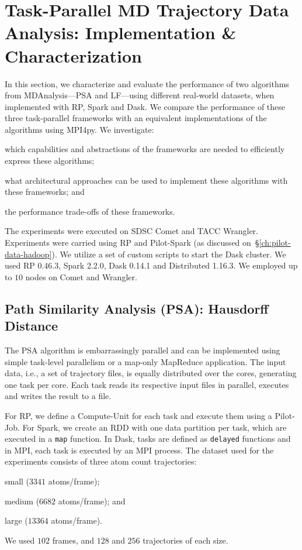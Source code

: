 \section{Task-Parallel MD Trajectory Data Analysis: Implementation \& Characterization}
\label{sec:impl_exp}

In this section, we characterize and evaluate the performance of two algorithms
from MDAnalysis---PSA and LF---using different real-world datasets,
when implemented with RP, Spark and Dask. We compare the performance
of these three task-parallel frameworks with an equivalent implementations of
the algorithms using MPI4py. We investigate:
\begin{inparaenum}[1)]
    \item which capabilities and abstractions of the frameworks are needed to
    efficiently express these algorithms;
    \item what architectural approaches can be used to implement these
    algorithms with these frameworks; and
    \item the performance trade-offs of these frameworks.
\end{inparaenum}

The experiments were executed on SDSC Comet and TACC Wrangler. Experiments were
carried using RP and Pilot-Spark (as discussed
on~\S\ref{ch:pilot-data-hadoop}). We utilize a set of custom scripts to start
the Dask cluster. We used RP 0.46.3, Spark 2.2.0, Dask 0.14.1 and
Distributed 1.16.3.
We employed up to $10$ nodes on Comet and Wrangler.

\subsection{Path Similarity Analysis (PSA): Hausdorff Distance}
\label{sec:psa}

The PSA algorithm is embarrassingly parallel and can be implemented using simple
task-level parallelism or a map-only MapReduce application. The input data,
i.e., a set of trajectory files, is equally distributed over the cores,
generating one task per core. Each task reads its respective input files in
parallel, executes and writes the result to a file.

For RP, we define a Compute-Unit for each task and execute them using
a Pilot-Job. For Spark, we create an RDD with one data partition per task, which
are executed in a \texttt{map} function. In Dask, tasks are defined as
\texttt{delayed} functions and in MPI, each task is executed by an MPI process.
The dataset used for the experiments consists of three atom count trajectories:
\begin{inparaenum}[1)]
    \item small ($3341$ atoms/frame);
    \item medium ($6682$ atoms/frame); and
    \item large ($13364$ atoms/frame).
\end{inparaenum}
We used $102$ frames, and $128$ and $256$ trajectories of each size.

